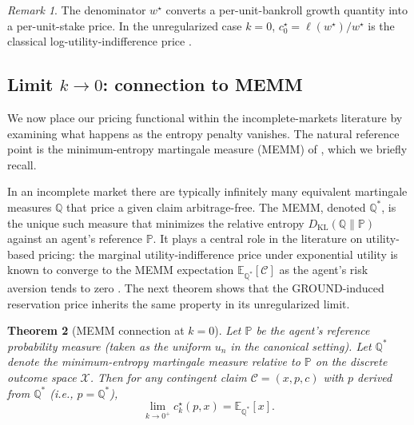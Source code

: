 \documentclass[11pt]{article}
\newtheorem{theorem}{Theorem}
\theoremstyle{definition}
\theoremstyle{remark}
\newtheorem{remark}[theorem]{Remark}
\newcommand{\E}{\mathbb{E}}
\newcommand{\PP}{\mathbb{P}}
\newcommand{\Q}{\mathbb{Q}}
\newcommand{\C}{\mathcal{C}}
\newcommand{\X}{\mathcal{X}}
\newcommand{\KL}{D_{\mathrm{KL}}}
\begin{document}
\begin{remark}
The denominator $w^\star$ converts a per-unit-bankroll growth quantity
into a per-unit-stake price. In the unregularized case $k = 0$,
$c^\star_0 = \ell(w^\star)/w^\star$ is the classical
log-utility-indifference price \citep{maclean2011}.
\end{remark}

\subsection{Limit \texorpdfstring{$k \to 0$}{k to 0}: connection to MEMM}

We now place our pricing functional within the incomplete-markets
literature by examining what happens as the entropy penalty vanishes.
The natural reference point is the minimum-entropy martingale measure
(MEMM) of \citet{frittelli2000}, which we briefly recall.

In an incomplete market there are typically infinitely many
equivalent martingale measures $\Q$ that price a given claim
arbitrage-free. The MEMM, denoted $\Q^*$, is the unique such measure
that minimizes the relative entropy $\KL(\Q \| \PP)$ against an
agent's reference $\PP$. It plays a central role in the literature on
utility-based pricing: the marginal utility-indifference price under
exponential utility is known to converge to the MEMM expectation
$\E_{\Q^*}[\C]$ as the agent's risk aversion tends to zero
\citep{frittelli2000,delbaen2002,fujiwara2003}. The next theorem
shows that the GROUND-induced reservation price inherits the same
property in its unregularized limit.

\begin{theorem}[MEMM connection at $k = 0$]\label{thm:memm}
Let $\PP$ be the agent's reference probability measure (taken as the
uniform $u_n$ in the canonical setting). Let $\Q^*$ denote the
minimum-entropy martingale measure relative to $\PP$ on the discrete
outcome space $\X$. Then for any contingent claim $\C = (x, p, c)$
with $p$ derived from $\Q^*$ (i.e., $p = \Q^*$),
\begin{equation*}
\lim_{k \to 0^+} c^\star_k(p, x) = \E_{\Q^*}[x].
\end{equation*}
\end{theorem}
\end{document}
